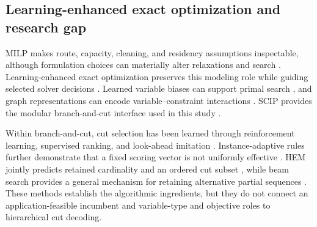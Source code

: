\documentclass[preprint,12pt,authoryear]{elsarticle}
\begin{document}
\subsection{Learning-enhanced exact optimization and research gap}

MILP makes route, capacity, cleaning, and residency assumptions inspectable,
although formulation choices can materially alter relaxations and search
\citep{adelgren2023recordkeeping}. Learning-enhanced exact optimization
preserves this modeling role while guiding selected solver decisions
\citep{bengio2021machine,scavuzzo2024mlbb}. Learned variable biases can support
primal search \citep{khalil2022mipgnn}, and graph representations can encode
variable--constraint interactions
\citep{cappart2023gnnco,chen2023milpgnn}. SCIP provides the modular
branch-and-cut interface used in this study
\citep{achterberg2009scip,bestuzheva2023scip}.

Within branch-and-cut, cut selection has been learned through reinforcement
learning, supervised ranking, and look-ahead imitation
\citep{tang2020cut,huang2022cutranking,paulus2022looking}.
Instance-adaptive rules further demonstrate that a fixed scoring vector is not
uniformly effective \citep{turner2023adaptive}. HEM jointly predicts retained
cardinality and an ordered cut subset
\citep{wang2023hem,wang2024hemtpami}, while beam search provides a general
mechanism for retaining alternative partial sequences
\citep{choo2022beam}. These methods establish the algorithmic ingredients,
but they do not connect an application-feasible incumbent and
variable-type and objective roles to hierarchical cut decoding.

\begin{table}[htbp]
\centering
\caption{Positioning relative to representative recent cluster-tool studies.}
\label{tab:research-position}
\end{table}
\end{document}
